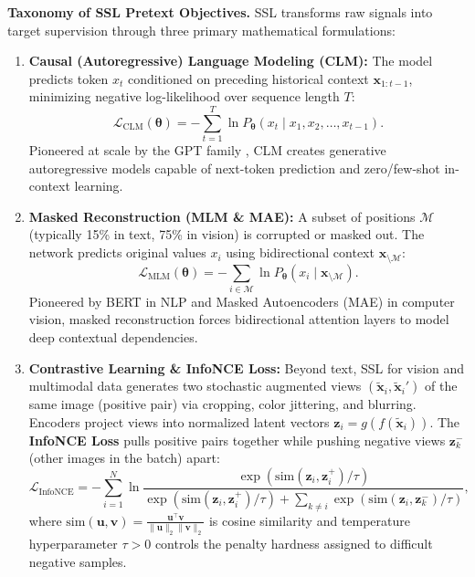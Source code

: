 \documentclass[11pt,a4paper]{article}
\begin{document}
	\textbf{Taxonomy of SSL Pretext Objectives.} SSL transforms raw signals into target supervision through three primary mathematical formulations:
	\begin{enumerate}
		\item \textbf{Causal (Autoregressive) Language Modeling (CLM):} The model predicts token $x_t$ conditioned on preceding historical context $\mathbf{x}_{1:t-1}$, minimizing negative log-likelihood over sequence length $T$:
		\begin{equation}
			\mathcal{L}_{\mathrm{CLM}}(\boldsymbol{\theta}) = -\sum_{t=1}^{T} \ln P_{\boldsymbol{\theta}}(x_t \mid x_1, x_2, \dots, x_{t-1}).
		\end{equation}
		Pioneered at scale by the GPT family \parencite{radford2018, brown2020}, CLM creates generative autoregressive models capable of next-token prediction and zero/few-shot in-context learning.
		
		\item \textbf{Masked Reconstruction (MLM \& MAE):} A subset of positions $\mathcal{M}$ (typically 15\% in text, 75\% in vision) is corrupted or masked out. The network predicts original values $x_i$ using bidirectional context $\mathbf{x}_{\setminus \mathcal{M}}$:
		\begin{equation}
			\mathcal{L}_{\mathrm{MLM}}(\boldsymbol{\theta}) = -\sum_{i \in \mathcal{M}} \ln P_{\boldsymbol{\theta}}(x_i \mid \mathbf{x}_{\setminus \mathcal{M}}).
		\end{equation}
		Pioneered by BERT \parencite{devlin2019} in NLP and Masked Autoencoders (MAE) \parencite{he2022} in computer vision, masked reconstruction forces bidirectional attention layers to model deep contextual dependencies.
		
		\item \textbf{Contrastive Learning \& InfoNCE Loss:} Beyond text, SSL for vision and multimodal data generates two stochastic augmented views $(\tilde{\mathbf{x}}_i, \tilde{\mathbf{x}}_i')$ of the same image (positive pair) via cropping, color jittering, and blurring. Encoders project views into normalized latent vectors $\mathbf{z}_i = g(f(\tilde{\mathbf{x}}_i))$. The \textbf{InfoNCE Loss} \parencite{oord2018, chen2020} pulls positive pairs together while pushing negative views $\mathbf{z}_k^-$ (other images in the batch) apart:
		\begin{equation}
			\mathcal{L}_{\mathrm{InfoNCE}} = -\sum_{i=1}^{N} \ln \frac{\exp\left(\mathrm{sim}(\mathbf{z}_{i}, \mathbf{z}_{i}^+) / \tau\right)}{\exp\left(\mathrm{sim}(\mathbf{z}_{i}, \mathbf{z}_{i}^+) / \tau\right) + \sum_{k \neq i} \exp\left(\mathrm{sim}(\mathbf{z}_{i}, \mathbf{z}_{k}^-) / \tau\right)},
		\end{equation}
		where $\mathrm{sim}(\mathbf{u}, \mathbf{v}) = \frac{\mathbf{u}^{\!\top}\mathbf{v}}{\|\mathbf{u}\|_2 \|\mathbf{v}\|_2}$ is cosine similarity and temperature hyperparameter $\tau > 0$ controls the penalty hardness assigned to difficult negative samples.
	\end{enumerate}
\end{document}
